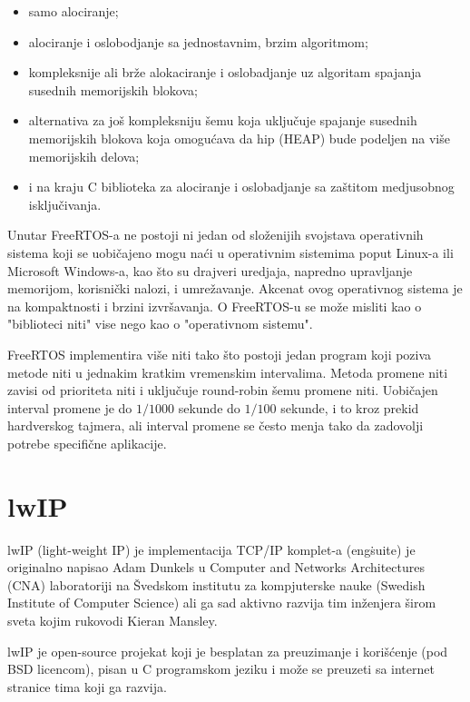 \documentclass[a4paper,12pt, master]{etf}
\begin{document}
	\begin{itemize}
		\item samo alociranje;
		\item alociranje i oslobodjanje sa jednostavnim, brzim algoritmom;
		\item kompleksnije ali br\v{z}e alokaciranje i oslobadjanje uz
		algoritam spajanja susednih memorijskih blokova;
		\item alternativa za jo\v{s} kompleksniju \v{s}emu koja uklju\v{c}uje
		spajanje susednih memorijskih blokova koja omogu\'{c}ava da hip (HEAP)
		bude podeljen na vi\v{s}e memorijskih delova;
		\item i na kraju C biblioteka za alociranje i oslobadjanje sa
		za\v{s}titom medjusobnog isklju\v{c}ivanja.
	\end{itemize}

	Unutar FreeRTOS-a ne postoji ni jedan od slo\v{z}enijih svojstava
	operativnih sistema koji se	uobi\v{c}ajeno mogu na\'{c}i u operativnim
	sistemima poput Linux-a ili Microsoft Windows-a, kao \v{s}to su drajveri
	uredjaja, napredno upravljanje memorijom, korisni\v{c}ki nalozi, i
	umre\v{z}avanje. Akcenat ovog operativnog sistema je na kompaktnosti i
	brzini izvr\v{s}avanja. O FreeRTOS-u se mo\v{z}e misliti kao o "biblioteci
	niti" vise nego kao o "operativnom sistemu".

	FreeRTOS implementira vi\v{s}e niti tako \v{s}to postoji jedan program koji
	poziva metode niti u jednakim kratkim vremenskim intervalima. Metoda
	promene niti zavisi od prioriteta niti i uklju\v{c}uje round-robin \v{s}emu
	promene niti. Uobi\v{c}ajen interval promene je do $1/1000$ sekunde
	do $1/100$ sekunde, i to kroz prekid hardverskog tajmera, ali interval
	promene se \v{c}esto menja tako da zadovolji potrebe specifi\v{c}ne
	aplikacije.

	\section{lwIP}

	lwIP (light-weight IP) je implementacija TCP/IP komplet-a (eng\. suite) je
    originalno napisao Adam Dunkels u Computer and Networks Architectures (CNA)
    laboratoriji na \v{S}vedskom institutu za kompjuterske nauke (Swedish
    Institute of Computer Science) ali ga sad aktivno razvija tim in\v{z}enjera
    \v{s}irom sveta kojim rukovodi Kieran Mansley\@.

	lwIP je open-source projekat koji je besplatan za preuzimanje i
	kori\v{s}\'{c}enje (pod BSD	licencom), pisan u C programskom jeziku i
	mo\v{z}e se preuzeti sa internet stranice tima koji	ga razvija.
\end{document}

